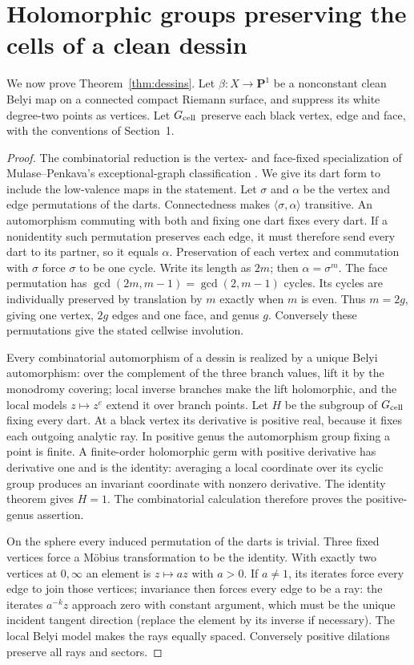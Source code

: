 \documentclass[11pt,a4paper]{article}
\theoremstyle{definition}
\begin{document}
\section{Holomorphic groups preserving the cells of a clean dessin}\label{sec:dessins}
We now prove Theorem~\ref{thm:dessins}. Let $\beta:X\to\mathbf P^1$ be a nonconstant clean Belyi map on a connected compact Riemann surface, and suppress its white degree-two points as vertices. Let $G_{\rm cell}$ preserve each black vertex, edge and face, with the conventions of Section~1.


\begin{proof}
The combinatorial reduction is the vertex- and face-fixed
specialization of Mulase--Penkava's exceptional-graph classification
\cite[pp.~880--881]{MulasePenkava}. We give its dart form to include
the low-valence maps in the statement. Let $\sigma$ and $\alpha$ be
the vertex and edge permutations of the darts. Connectedness makes $\langle\sigma,\alpha\rangle$ transitive. An automorphism commuting with both and fixing one dart fixes every dart. If a nonidentity such permutation preserves each edge, it must therefore send every dart to its partner, so it equals $\alpha$. Preservation of each vertex and commutation with $\sigma$ force $\sigma$ to be one cycle. Write its length as $2m$; then $\alpha=\sigma^m$. The face permutation has $\gcd(2m,m-1)=\gcd(2,m-1)$ cycles. Its cycles are individually preserved by translation by $m$ exactly when $m$ is even. Thus $m=2g$, giving one vertex, $2g$ edges and one face, and genus $g$. Conversely these permutations give the stated cellwise involution.

Every combinatorial automorphism of a dessin is realized by a unique Belyi automorphism: over the complement of the three branch values, lift it by the monodromy covering; local inverse branches make the lift holomorphic, and the local models $z\mapsto z^e$ extend it over branch points. Let $H$ be the subgroup of $G_{\rm cell}$ fixing every dart. At a black vertex its derivative is positive real, because it fixes each outgoing analytic ray. In positive genus the automorphism group fixing a point is finite. A finite-order holomorphic germ with positive derivative has derivative one and is the identity: averaging a local coordinate over its cyclic group produces an invariant coordinate with nonzero derivative. The identity theorem gives $H=1$. The combinatorial calculation therefore proves the positive-genus assertion.

On the sphere every induced permutation of the darts is trivial. Three fixed vertices force a M\"obius transformation to be the identity. With exactly two vertices at $0,\infty$ an element is $z\mapsto az$ with $a>0$. If $a\ne1$, its iterates force every edge to join those vertices; invariance then forces every edge to be a ray: the iterates $a^{-k}z$ approach zero with constant argument, which must be the unique incident tangent direction (replace the element by its inverse if necessary). The local Belyi model makes the rays equally spaced. Conversely positive dilations preserve all rays and sectors.


\end{proof}
\end{document}
